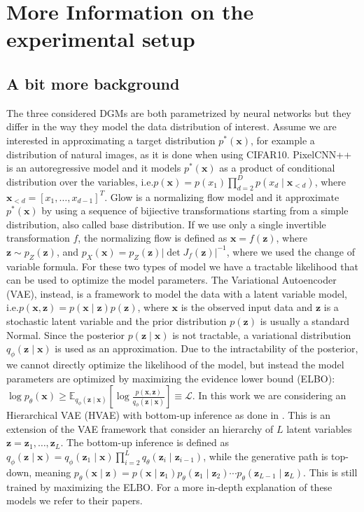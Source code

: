 {\section{More Information on the experimental setup}

\subsection{A bit more background}
The three considered DGMs are both parametrized by neural networks but they differ in the way they model the data distribution of interest. Assume we are interested in approximating a target distribution $p^*(\mathbf{x})$, for example a distribution of natural images, as it is done when using CIFAR10. PixelCNN++ is an autoregressive model and it models $p^*(\mathbf{x})$ as a product of conditional distribution over the variables, i.e.\@ $p(\mathbf{x}) = p(x_1) \prod_{d=2}^D p(x_d \mid \mathbf{x}_{<d})$, where $\mathbf{x}_{<d} = [x_1, \dots, x_{d-1}]^T$. Glow is a normalizing flow model and it approximate $p^*(\mathbf{x})$ by using a sequence of bijiective transformations starting from a simple distribution, also called base distribution. If we use only a single invertible transformation $f$, the normalizing  flow is defined as $\mathbf{x} = f(\mathbf{z})$, where $\mathbf{z} \sim p_{Z}(\mathbf{z})$, and $p_{X}(\mathbf{x}) = p_{Z}(\mathbf{z})|\det J_f(\mathbf{z}) |^{-1}$, where we used the change of variable formula. For these two types of model we have a tractable likelihood that can be used to optimize the model parameters. The Variational Autoencoder (VAE), instead, is a framework to model the data with a latent variable model, i.e.\@ $p(\mathbf{x}, \mathbf{z}) = p(\mathbf{x} \mid \mathbf{z}) p(\mathbf{z})$, where $\mathbf{x}$ is the observed input data and $\mathbf{z}$ is a stochastic latent variable and the prior distribution $p(\mathbf{z})$ is usually a standard Normal. Since the posterior $p(\mathbf{z}\mid\mathbf{x})$ is not tractable, a variational distribution $q_{\phi}(\mathbf{z}\mid\mathbf{x})$ is used as an approximation. Due to the intractability of the posterior, we cannot directly optimize the likelihood of the model, but instead the model parameters are optimized by maximizing the evidence lower bound (ELBO): $\log p_{\theta}(\mathbf{x}) \geq \mathbb{E}_{q_{\phi}(\mathbf{z}\mid \mathbf{x})} \left[ \log \frac{p(\mathbf{x}, \mathbf{z})}{q_{\phi}(\mathbf{z}\mid \mathbf{x})} \right] \equiv \mathcal{L} $. In this work we are considering an Hierarchical VAE (HVAE) with bottom-up inference as done in \parencite{havtorn_hierarchical_2021}. This is an extension of the VAE framework that consider an hierarchy of $L$ latent variables $\mathbf{z} = \mathbf{z}_1,\dots, \mathbf{z}_L$. The bottom-up inference is defined as $q_{\phi}(\mathbf{z}\mid \mathbf{x}) = q_{\phi}(\mathbf{z}_1\mid \mathbf{x})\prod_{i=2}^L q_{\theta}(\mathbf{z}_i \mid \mathbf{z}_{i-1})$, while the generative path is top-down, meaning $p_{\theta}(\mathbf{x}\mid \mathbf{z}) = p(\mathbf{x}\mid \mathbf{z}_1)p_{\theta}(\mathbf{z}_1\mid \mathbf{z}_2)\cdots p_{\theta}(\mathbf{z}_{L-1}\mid \mathbf{z}_L)$. This is still trained by maximizing the ELBO. For a more in-depth explanation of these models we refer to their papers.

}
